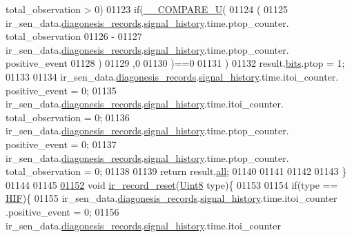 \begin{DoxyCode}
{{      total\_observation > 0)
01123     \textcolor{keywordflow}{if}(\hyperlink{a00021_a2ec57e7d50ba444ecb9e5c8b717d832d}{\_\_COMPARE\_U}(
01124           (
01125            ir\_sen\_data.\hyperlink{a00023_a7ae905b560513ad201e58c2f63375030}{diagonesis\_records}.\hyperlink{a00017_affb63906d23cb1cb7787d61eaaedfb60}{signal\_history}.time.ptop\_counter.
      total\_observation
01126           -
01127            ir\_sen\_data.\hyperlink{a00023_a7ae905b560513ad201e58c2f63375030}{diagonesis\_records}.\hyperlink{a00017_affb63906d23cb1cb7787d61eaaedfb60}{signal\_history}.time.ptop\_counter.
      positive\_event
01128           )
01129          ,0
01130           )==0
01131        )
01132         result.\hyperlink{a00021_a4c757443cba2deaf7051fd53f385a73e}{bits}.ptop = 1;
01133 
01134     ir\_sen\_data.\hyperlink{a00023_a7ae905b560513ad201e58c2f63375030}{diagonesis\_records}.\hyperlink{a00017_affb63906d23cb1cb7787d61eaaedfb60}{signal\_history}.time.itoi\_counter.
      positive\_event      = 0;
01135     ir\_sen\_data.\hyperlink{a00023_a7ae905b560513ad201e58c2f63375030}{diagonesis\_records}.\hyperlink{a00017_affb63906d23cb1cb7787d61eaaedfb60}{signal\_history}.time.itoi\_counter.
      total\_observation   = 0;
01136     ir\_sen\_data.\hyperlink{a00023_a7ae905b560513ad201e58c2f63375030}{diagonesis\_records}.\hyperlink{a00017_affb63906d23cb1cb7787d61eaaedfb60}{signal\_history}.time.ptop\_counter.
      positive\_event      = 0;
01137     ir\_sen\_data.\hyperlink{a00023_a7ae905b560513ad201e58c2f63375030}{diagonesis\_records}.\hyperlink{a00017_affb63906d23cb1cb7787d61eaaedfb60}{signal\_history}.time.ptop\_counter.
      total\_observation   = 0;
01138 
01139     \textcolor{keywordflow}{return} result.\hyperlink{a00021_a2625a533c46821f49caaf4dcc77316b1}{all};
01140 
01141 
01142 
01143 \}
01144 
01145 
\hypertarget{a00045_source_l01152}{}\hyperlink{a00045_a1c9872e93491d95a24ab0bc723d39a74}{01152} \textcolor{keywordtype}{void} \hyperlink{a00045_a1c9872e93491d95a24ab0bc723d39a74}{ir\_record\_reset}(\hyperlink{a00072_af84840501dec18061d18a68c162a8fa2}{Uint8} type)\{
01153 
01154     \textcolor{keywordflow}{if}(type == \hyperlink{a00017_aaa1c1ffe30eff38b979b1af9d4e4ef19}{HIF})\{
01155             ir\_sen\_data.\hyperlink{a00023_a7ae905b560513ad201e58c2f63375030}{diagonesis\_records}.\hyperlink{a00017_affb63906d23cb1cb7787d61eaaedfb60}{signal\_history}.time.itoi\_counter
      .positive\_event      = 0;
01156             ir\_sen\_data.\hyperlink{a00023_a7ae905b560513ad201e58c2f63375030}{diagonesis\_records}.\hyperlink{a00017_affb63906d23cb1cb7787d61eaaedfb60}{signal\_history}.time.itoi\_counter
}}
\end{DoxyCode}
